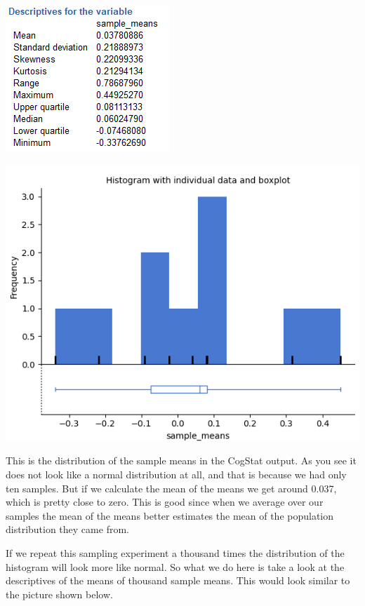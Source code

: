\documentclass[
]{book}
\begin{document}
\includegraphics{img/ch4/4.6samplemeansdescriptives.png}

\includegraphics{img/ch4/4.6samplemeanshisto.png}

This is the distribution of the sample means in the CogStat output. As you see it does not look like a normal distribution at all, and that is because we had only ten samples. But if we calculate the mean of the means we get around 0.037, which is pretty close to zero. This is good since when we average over our samples the mean of the means better estimates the mean of the population distribution they came from.

If we repeat this sampling experiment a thousand times the distribution of the histogram will look more like normal. So what we do here is take a look at the descriptives of the means of thousand sample means. This would look similar to the picture shown below.
\end{document}
